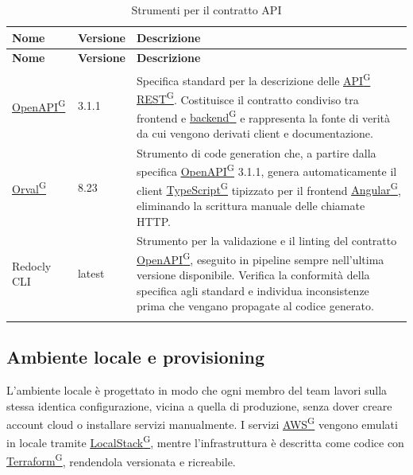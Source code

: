 \documentclass[a4paper,12pt]{article}
\providecommand{\glslink}[2]{\href{https://alittlebyte-19.github.io/Documentazione/glossario.html\#gls-#1}{\underline{#2}\textsuperscript{\scriptsize G}}}
\begin{document}
\renewcommand{\arraystretch}{1.3}
{\small
\setlength{\LTleft}{0pt}
\setlength{\LTright}{0pt}
\begin{longtable}{|p{3cm}|p{1.8cm}|p{9.7cm}|}
    \hline
    \rowcolor{gray!20}
    \textbf{Nome} & \textbf{Versione} & \textbf{Descrizione} \\
    \hline
    \endfirsthead
    \hline
    \rowcolor{gray!20}
    \textbf{Nome} & \textbf{Versione} & \textbf{Descrizione} \\
    \hline
    \endhead
    \glslink{openapi}{OpenAPI} & 3.1.1 & Specifica standard per la descrizione delle \glslink{api-application-programming-interface}{API} \glslink{rest-representational-state-transfer}{REST}. Costituisce il contratto condiviso tra frontend e \glslink{backend}{backend} e rappresenta la fonte di verità da cui vengono derivati client e documentazione. \\
    \hline
    \glslink{orval}{Orval} & 8.23 & Strumento di code generation che, a partire dalla specifica \glslink{openapi}{OpenAPI} 3.1.1, genera automaticamente il client \glslink{typescript}{TypeScript} tipizzato per il frontend \glslink{angular}{Angular}, eliminando la scrittura manuale delle chiamate HTTP. \\
    \hline
    Redocly CLI & latest & Strumento per la validazione e il linting del contratto \glslink{openapi}{OpenAPI}, eseguito in pipeline sempre nell'ultima versione disponibile. Verifica la conformità della specifica agli standard e individua inconsistenze prima che vengano propagate al codice generato. \\
    \hline
    \caption{Strumenti per il contratto API}
\end{longtable}
}

\subsection{Ambiente locale e provisioning}

L'ambiente locale è progettato in modo che ogni membro del team lavori sulla stessa identica configurazione, vicina a quella di produzione, senza dover creare account cloud o installare servizi manualmente. I servizi \glslink{aws}{AWS} vengono emulati in locale tramite \glslink{localstack}{LocalStack}, mentre l'infrastruttura è descritta come codice con \glslink{terraform}{Terraform}, rendendola versionata e ricreabile.
\end{document}
